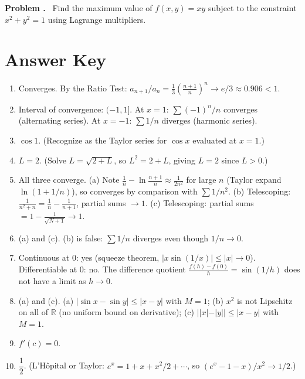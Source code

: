 \documentclass[11pt]{article}
\newcounter{prob}
\newcommand{\problem}{\stepcounter{prob}\medskip\noindent\textbf{Problem \theprob.}\ }
\begin{document}
\problem
Find the maximum value of $f(x,y) = xy$ subject to the constraint $x^2 + y^2 = 1$ using Lagrange multipliers.


\newpage
\section*{Answer Key}

\begin{enumerate}
\item Converges. By the Ratio Test: $a_{n+1}/a_n = \frac{1}{3}\!\left(\frac{n+1}{n}\right)^{\!n} \to e/3 \approx 0.906 < 1$.

\item Interval of convergence: $(-1, 1]$. At $x=1$: $\sum (-1)^n/n$ converges (alternating series). At $x=-1$: $\sum 1/n$ diverges (harmonic series).

\item $\cos 1$. (Recognize as the Taylor series for $\cos x$ evaluated at $x=1$.)

\item $L = 2$. (Solve $L = \sqrt{2+L}$, so $L^2 = 2+L$, giving $L=2$ since $L>0$.)

\item All three converge. \quad (a) Note $\frac{1}{n}-\ln\frac{n+1}{n} \approx \frac{1}{2n^2}$ for large $n$ (Taylor expand $\ln(1+1/n)$), so converges by comparison with $\sum 1/n^2$. (b) Telescoping: $\frac{1}{n^2+n}=\frac{1}{n}-\frac{1}{n+1}$, partial sums $\to 1$. (c) Telescoping: partial sums $= 1-\frac{1}{\sqrt{N+1}}\to 1$.

\item (a) and (c). \quad (b) is false: $\sum 1/n$ diverges even though $1/n\to 0$.

\item Continuous at $0$: yes (squeeze theorem, $|x\sin(1/x)|\le|x|\to 0$). Differentiable at $0$: no. The difference quotient $\frac{f(h)-f(0)}{h}=\sin(1/h)$ does not have a limit as $h\to 0$.

\item (a) and (c). \quad (a) $|\sin x - \sin y|\le|x-y|$ with $M=1$; (b) $x^2$ is not Lipschitz on all of $\mathbb{R}$ (no uniform bound on derivative); (c) $||x|-|y||\le|x-y|$ with $M=1$.

\item $f'(c) = 0$.

\item $\dfrac{1}{2}$. (L'H\^opital or Taylor: $e^x = 1+x+x^2/2+\cdots$, so $(e^x-1-x)/x^2 \to 1/2$.)


\end{enumerate}
\end{document}
